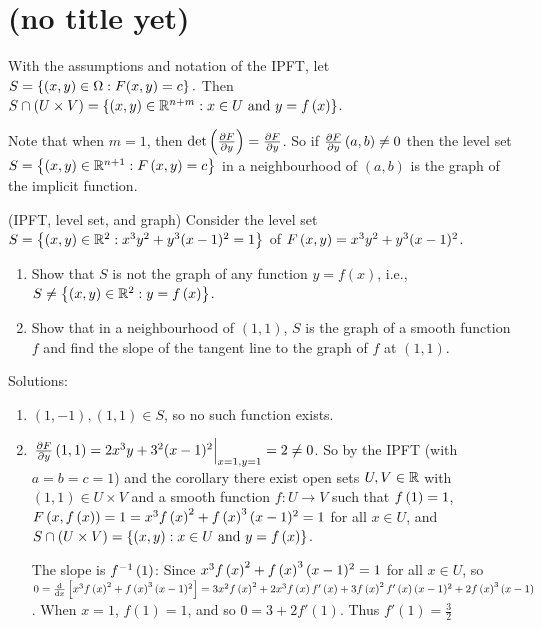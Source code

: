 \chapter{(no title yet)}


\begin{corollary}
    With the assumptions and notation of the IPFT, let $S = \left\{(x,y) \in \Omega: F(x,y) = c\right\}.$ Then $S \cap (U \times V) = \left\{(x,y) \in \mathbb{R}^{n + m}: x \in U \text{ and } y = f\left(x\right)\right\}$.
\end{corollary}

\begin{remark}
    Note that when $m=1$, then $\det\left(\frac{\partial F}{\partial y}\right) = \frac{\partial F}{\partial y}$. So if $\frac{\partial F}{\partial y}\left(a,b\right) \neq 0$ then the level set $S = \left\{(x,y) \in \mathbb{R}^{n+1}: F\left(x,y\right) = c\right\}$ in a neighbourhood of $(a,b)$ is the graph of the implicit function.
\end{remark}

\begin{example}(IPFT, level set, and graph)
    Consider the level set $S = \left\{(x,y) \in \mathbb{R}^2: x^3y^2+y^3(x-1)^2 = 1\right\}$ of $F\left(x,y\right) = x^3y^2 + y^3(x-1)^2$.
    \begin{enumerate}
        \item Show that $S$ is not the graph of any function $y = f(x)$, i.e., $S \neq \left\{(x,y) \in \mathbb{R}^2: y = f\left(x\right)\right\}$.
        \item Show that in a neighbourhood of $(1,1)$, $S$ is the graph of a smooth function $f$ and find the slope of the tangent line to the graph of $f$ at $(1,1)$.
    \end{enumerate}

    Solutions:
    \begin{enumerate}
        \item $(1,-1), (1,1) \in S$, so no such function exists.
        \item $\left.\frac{\partial F}{\partial y}\left(1,1\right) = 2x^3y + 3^2(x-1)^2\right|_{x=1, y=1} = 2 \neq 0$. So by the IPFT (with $a=b=c=1$) and the corollary there exist open sets $U, V \in \mathbb{R}$ with $(1,1) \in U \times V$ and a smooth function $f: U \to V$ such that $f\left(1\right) = 1$, $F\left(x, f\left(x\right)\right) = 1 = x^3f\left(x\right)^2 + f\left(x\right)^3(x-1)^2 = 1$ for all $x \in U$, and $S \cap (U \times V) = \left\{(x,y): x \in U \text{ and } y = f\left(x\right)\right\}$.
        
        The slope is $f^{-1}\left(1\right)$: Since $x^3 f\left(x\right)^2 + f\left(x\right)^3 (x-1)^2 = 1$ for all $x \in U$, so $0 = \frac{\mathrm{d}}{\mathrm{d}x}\left[x^3 f\left(x\right)^2 + f\left(x\right)^3 (x-1)^2\right] = 3x^2 f\left(x\right)^2 + 2x^3 f\left(x\right) f'\left(x\right) + 3f\left(x\right)^2 f'\left(x\right) (x-1)^2 + 2f\left(x\right)^3 (x-1)$.
        When $x = 1$,  $f(1) = 1$, and so $0 = 3 + 2f'(1)$. Thus $f'(1) = \frac{3}{2}$
    \end{enumerate}
\end{example}

